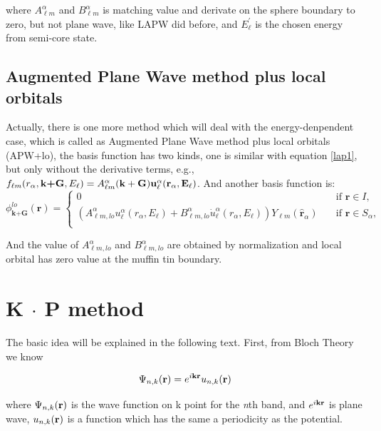 \documentclass[a4paper]{report}
\begin{document}
where $A _{{\ell}m}^{\alpha}$ and $B _{{\ell}m}^{\alpha}$ is matching value and derivate on the sphere boundary to zero, but not plane wave, like LAPW did before, and $E^{\prime}_{\ell}$ is
the chosen energy from semi-core state.

\section{Augmented Plane Wave method plus local orbitals}
Actually, there is one more method which will deal with the energy-denpendent case, which is called as Augmented Plane Wave method plus local orbitals (APW+lo), the 
basis function has two kinds, one is similar with equation \ref{lap1}, but only without the derivative terms, e.g., $f_{{\ell}{m}} (r_{\alpha},\textbf{k+G} ,E_{\ell}) =  A _{{\ell}m}^{\alpha} \bf(k+G) u_{{\ell}}^{\alpha}(r_{\alpha}, E_{\ell})$.
And another basis function is:
\begin{equation*}\label{lap3}
\phi^{lo}_\textbf{k+G} (\textbf{r})= 
\begin{cases} 0 & \quad \mbox{if $\textbf{r} \in I, $}
\\
(A _{{\ell}m,lo}^{\alpha}  u_{{\ell}}^{\alpha}(r_{\alpha}, E_{\ell}) + B _{{\ell}m,lo}^{\alpha}  \dot{u}_{{\ell}}^{\alpha}(r_{\alpha}, E_{\ell}) ){Y_{{\ell}m}(\hat{\textbf{r}}_{\alpha})} & \quad \mbox{if $\textbf{r} \in S_\alpha, $}\\ 
\end{cases}
\end{equation*}
 
And the value of $A _{{\ell}m,lo}^{\alpha}$ and $B _{{\ell}m,lo}^{\alpha}$ are obtained by normalization and local orbital has zero value at the muffin tin boundary.

\chapter{K $\cdot$ P method}

The basic idea will be explained in the following text. First, from Bloch Theory we know 

\begin{equation}\label{1}
 \wfbloch<n><k> = \expg<k> \ubloch<n><k>
\end{equation}

where $\wfbloch<n><k>$ is the wave function on k point for the {\it n}th band, and $\expg<k>$ is plane wave, $\ubloch<n><k>$ is a function which has the same a periodicity as the potential.
\end{document}
